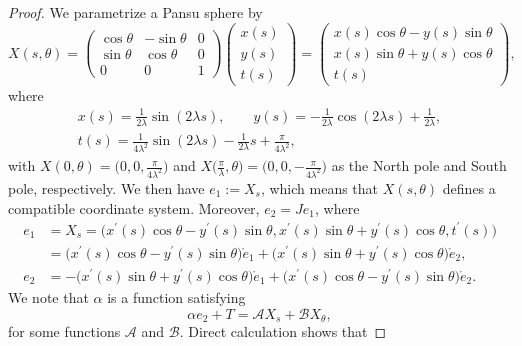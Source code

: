\documentclass[10pt,a4paper]{amsart}
\numberwithin{equation}{section}
\begin{document}
\begin{proof}
We parametrize a Pansu sphere by
\begin{equation} \label{paps}
X(s,\theta)= \left(
\begin{matrix}
\cos \theta & -\sin \theta & 0 \\
\sin \theta & \cos \theta & 0 \\
0 & 0 & 1
\end{matrix}
\right)\left(
\begin{matrix}
x(s) \\
y(s) \\
t(s)
\end{matrix}
\right)=\left(
\begin{matrix}
x(s)\cos \theta-y(s)\sin \theta \\
x(s)\sin \theta+y(s)\cos \theta \\
t(s)
\end{matrix}
\right),
\end{equation}
where
\begin{gather}
x(s) = \frac{1}{2\lambda}\sin(2\lambda s),\qquad
y(s) = -\frac{1}{2\lambda}\cos(2\lambda s)+ \frac{1}{2\lambda},\nonumber\\
t(s) = \frac{1}{4\lambda^2}\sin(2\lambda s)- \frac{1}{2\lambda}s+\frac{
\pi}{4\lambda^2}, \label{ad}
\end{gather}
with $X(0,\theta)=\bigl(0,0,\frac{\pi}{4\lambda^2}\bigr)$ and $X\bigl(\frac{\pi}{\lambda},\theta\bigr)=\bigl(0,0,-\frac{\pi}{4\lambda^2}\bigr)$ as the North pole and South pole, respectively.
We then have $e_1:=X_s$, which means that $X(s,\theta)$
defines a compatible coordinate system. Moreover, $e_2=Je_1$, where
\begin{align*}
e_1&=X_s=\bigl(x^{\prime }(s)\cos \theta-y^{\prime }(s)\sin \theta,x^{\prime
}(s)\sin \theta+y^{\prime }(s)\cos \theta,t^{\prime }(s)\bigr) \\
&=\bigl(x^{\prime }(s)\cos \theta-y^{\prime }(s)\sin \theta\bigr) \mathring
e_1+\bigl(x^{\prime }(s)\sin \theta+y^{\prime }(s)\cos \theta\bigr)\mathring
e_2, \\
e_2&=-\bigl(x^{\prime }(s)\sin \theta+y^{\prime }(s)\cos \theta\bigr)\mathring
e_1+\bigl(x^{\prime }(s)\cos \theta-y^{\prime }(s)\sin \theta\bigr) \mathring e_2.
\end{align*}
We note that $\alpha$ is a function satisfying
\begin{equation} \label{aa}
\alpha e_2+T=\mathcal{A}X_s+\mathcal{B}X_\theta,
\end{equation}
for some functions $\mathcal{A}$ and $\mathcal{B}$. Direct calculation shows that

\end{proof}
\end{document}
